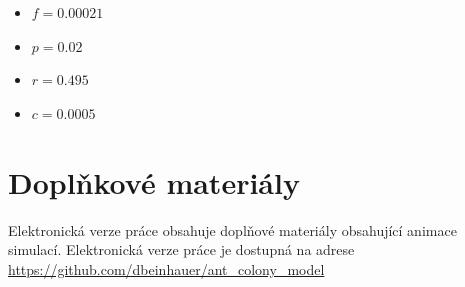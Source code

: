 \documentclass[10pt,a4paper,twocolumn]{article}
\begin{document}
\begin{itemize}
  \item $f = 0.00021$
  \item $p = 0.02$
  \item $r = 0.495$
  \item $c = 0.0005$
\end{itemize}





\section*{Doplňkové materiály}
Elektronická verze práce obsahuje doplňové materiály obsahující
animace simulací. Elektronická verze práce je dostupná na adrese
\url{https://github.com/dbeinhauer/ant_colony_model}
\end{document}
